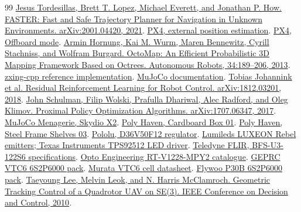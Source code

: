 \documentclass[a4paper,11pt]{article}
\begin{document}
\begin{thebibliography}{99}
 \href{https://arxiv.org/abs/2001.04420}{Jesus Tordesillas, Brett T. Lopez, Michael Everett, and Jonathan P. How. FASTER: Fast and Safe Trajectory Planner for Navigation in Unknown Environments. arXiv:2001.04420, 2021}.
 \href{https://docs.px4.io/main/en/ros/external_position_estimation}{PX4, external position estimation}.
 \href{https://docs.px4.io/main/en/flight_modes/offboard}{PX4, Offboard mode}.
 \href{https://doi.org/10.1007/s10514-012-9321-0}{Armin Hornung, Kai M. Wurm, Maren Bennewitz, Cyrill Stachniss, and Wolfram Burgard. OctoMap: An Efficient Probabilistic 3D Mapping Framework Based on Octrees. Autonomous Robots, 34:189–206, 2013}.
 \href{https://github.com/zxing-cpp/zxing-cpp}{zxing-cpp reference implementation}.
 \href{https://mujoco.readthedocs.io/en/stable/overview.html}{MuJoCo documentation}.
 \href{https://arxiv.org/abs/1812.03201}{Tobias Johannink et al. Residual Reinforcement Learning for Robot Control. arXiv:1812.03201, 2018}.
 \href{https://arxiv.org/abs/1707.06347}{John Schulman, Filip Wolski, Prafulla Dhariwal, Alec Radford, and Oleg Klimov. Proximal Policy Optimization Algorithms. arXiv:1707.06347, 2017}.
 \href{https://github.com/google-deepmind/mujoco_menagerie/tree/main/skydio_x2}{MuJoCo Menagerie, Skydio X2}.
 \href{https://polyhaven.com/a/cardboard_box_01}{Poly Haven, Cardboard Box 01}.
 \href{https://polyhaven.com/a/steel_frame_shelves_03}{Poly Haven, Steel Frame Shelves 03}.
 \href{https://www.pololu.com/product/4095}{Pololu, D36V50F12 regulator}.
 \href{https://lumileds.com/products/high-power-leds/luxeon-rebel/}{Lumileds LUXEON Rebel emitters; Texas Instruments TPS92512 LED driver}.
 \href{https://softwareservices.flir.com/BFS-U3-122S6/latest/Model/spec.html}{Teledyne FLIR, BFS-U3-122S6 specifications}.
 \href{https://www.opto-e.com/en/products/en-12rt-series/RT-V1228-MPY2}{Opto Engineering RT-V1228-MPY2 catalogue}.
 \href{https://geprc.com/product/geprc-vtc6-18650-6s2p-6000mah-batteries/}{GEPRC VTC6 6S2P6000 pack}.
 \href{https://www.murata.com/-/media/webrenewal/products/batteries/cylindrical/datasheet/us18650vtc6-product-datasheet.ashx}{Murata VTC6 cell datasheet}.
 \href{https://flywoo.net/products/flywoo-explorer-molicell-p30b-18650-6s2p-6000mah-lionpack-battery}{Flywoo P30B 6S2P6000 pack}.
 \href{https://www.math.ucsd.edu/~mleok/pdf/LeLeMc2010_quadrotor.pdf}{Taeyoung Lee, Melvin Leok, and N. Harris McClamroch. Geometric Tracking Control of a Quadrotor UAV on SE(3). IEEE Conference on Decision and Control, 2010}.

\end{thebibliography}
\end{document}
